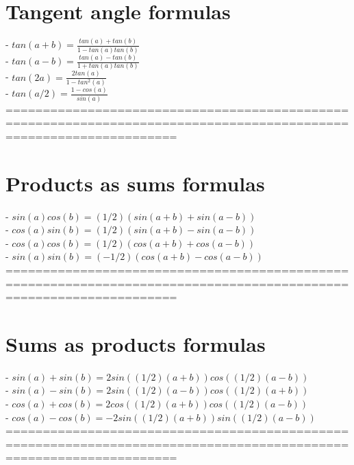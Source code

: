 \documentclass{book}
\begin{document}
\section{Tangent angle formulas}
	- $tan(a+b) = \frac{tan(a) + tan(b)}{1 - tan(a) tan(b)}$ \\
	- $tan(a-b) = \frac{tan(a) - tan(b)}{1 + tan(a) tan(b)}$ \\
	- $tan(2a) = \frac{2 tan(a)}{1 - tan^2(a)}$ \\
	- $tan(a/2) = \frac{1 - cos(a)}{sin(a)}$ \\
	===================================================================================================================
\section{Products as sums formulas}
	- $sin(a) cos(b) = (1/2) (sin(a+b) + sin(a-b))$ \\
	- $cos(a) sin(b) = (1/2) (sin(a+b) - sin(a-b))$ \\
	- $cos(a) cos(b) = (1/2) (cos(a+b) + cos(a-b))$ \\
	- $sin(a) sin(b) = (-1/2) (cos(a+b) - cos(a-b))$ \\
	===================================================================================================================
\section{Sums as products formulas}
	- $sin(a) + sin(b) = 2 sin((1/2) (a + b)) cos((1/2) (a - b))$ \\
	- $sin(a) - sin(b) = 2 sin((1/2) (a - b)) cos((1/2) (a + b))$ \\
	- $cos(a) + cos(b) = 2 cos((1/2) (a + b)) cos((1/2) (a - b))$ \\
	- $cos(a) - cos(b) = -2 sin((1/2) (a + b)) sin((1/2) (a - b))$ \\
	===================================================================================================================
\end{document}
